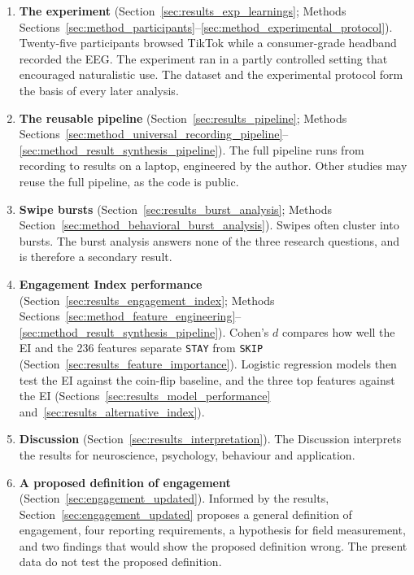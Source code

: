 \documentclass[12pt,a4paper]{report}
\begin{document}
\begin{enumerate}
\item \textbf{The experiment} (Section~\ref{sec:results_exp_learnings}; Methods Sections~\ref{sec:method_participants}--\ref{sec:method_experimental_protocol}). Twenty-five participants browsed TikTok while a consumer-grade headband recorded the EEG. The experiment ran in a partly controlled setting that encouraged naturalistic use. The dataset and the experimental protocol form the basis of every later analysis.

\item \textbf{The reusable pipeline} (Section~\ref{sec:results_pipeline}; Methods Sections~\ref{sec:method_universal_recording_pipeline}--\ref{sec:method_result_synthesis_pipeline}). The full pipeline runs from recording to results on a laptop, engineered by the author. Other studies may reuse the full pipeline, as the code is public.

\item \textbf{Swipe bursts} (Section~\ref{sec:results_burst_analysis}; Methods Section~\ref{sec:method_behavioral_burst_analysis}). Swipes often cluster into bursts. The burst analysis answers none of the three research questions, and is therefore a secondary result.

\item \textbf{Engagement Index performance} (Section~\ref{sec:results_engagement_index}; Methods Sections~\ref{sec:method_feature_engineering}--\ref{sec:method_result_synthesis_pipeline}). Cohen's \(d\) compares how well the EI and the 236 features separate \texttt{STAY} from \texttt{SKIP} (Section~\ref{sec:results_feature_importance}). Logistic regression models then test the EI against the coin-flip baseline, and the three top features against the EI (Sections~\ref{sec:results_model_performance} and~\ref{sec:results_alternative_index}).

\item \textbf{Discussion} (Section~\ref{sec:results_interpretation}). The Discussion interprets the results for neuroscience, psychology, behaviour and application.

\item \textbf{A proposed definition of engagement} (Section~\ref{sec:engagement_updated}). Informed by the results, Section~\ref{sec:engagement_updated} proposes a general definition of engagement, four reporting requirements, a hypothesis for field measurement, and two findings that would show the proposed definition wrong. The present data do not test the proposed definition.
\end{enumerate}
\end{document}
